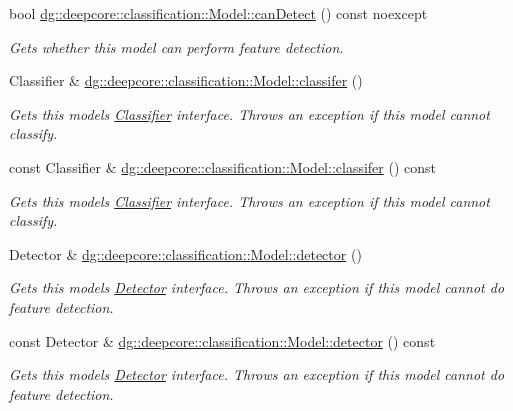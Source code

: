 \begin{DoxyCompactItemize}
bool \hyperlink{group___classification_module_gaafe846e469639d35d62b4f68bc59d85c}{dg\+::deepcore\+::classification\+::\+Model\+::can\+Detect} () const noexcept
\begin{DoxyCompactList}\small\item\em Gets whether this model can perform feature detection. \end{DoxyCompactList}\item 
Classifier \& \hyperlink{group___classification_module_gafe563e22d16379a9cd82e0a46d08e15a}{dg\+::deepcore\+::classification\+::\+Model\+::classifer} ()
\begin{DoxyCompactList}\small\item\em Gets this model\textquotesingle{}s \hyperlink{classdg_1_1deepcore_1_1classification_1_1_classifier}{Classifier} interface. Throws an exception if this model cannot classify. \end{DoxyCompactList}\item 
const Classifier \& \hyperlink{group___classification_module_gad1c66c709abc2247957f20cb6b9f9fc6}{dg\+::deepcore\+::classification\+::\+Model\+::classifer} () const 
\begin{DoxyCompactList}\small\item\em Gets this model\textquotesingle{}s \hyperlink{classdg_1_1deepcore_1_1classification_1_1_classifier}{Classifier} interface. Throws an exception if this model cannot classify. \end{DoxyCompactList}\item 
Detector \& \hyperlink{group___classification_module_gadf0416476dc05f6e06f6c9f1f86b149d}{dg\+::deepcore\+::classification\+::\+Model\+::detector} ()
\begin{DoxyCompactList}\small\item\em Gets this model\textquotesingle{}s \hyperlink{classdg_1_1deepcore_1_1classification_1_1_detector}{Detector} interface. Throws an exception if this model cannot do feature detection. \end{DoxyCompactList}\item 
const Detector \& \hyperlink{group___classification_module_ga1758ede5c855a4a52556b9f97e1454a8}{dg\+::deepcore\+::classification\+::\+Model\+::detector} () const 
\begin{DoxyCompactList}\small\item\em Gets this model\textquotesingle{}s \hyperlink{classdg_1_1deepcore_1_1classification_1_1_detector}{Detector} interface. Throws an exception if this model cannot do feature detection. \end{DoxyCompactList}\item 

\end{DoxyCompactItemize}
